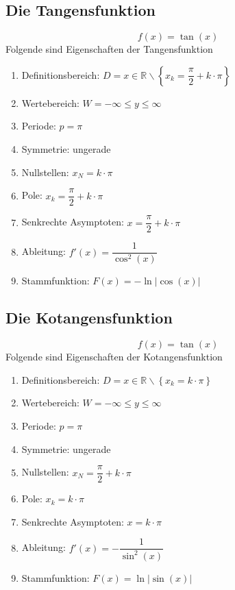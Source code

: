 \subsection{Die Tangensfunktion}
\begin{equation}
\boxed{f\left(x\right)=\tan\left(x\right)}
\end{equation}
Folgende sind Eigenschaften der Tangensfunktion
\begin{enumerate}[$(a)$]
\item Definitionsbereich: $D=x\in \mathbb{R}\backslash \left\{x_k=\dfrac{\pi}{2}+k\cdot \pi\right\}$
\item Wertebereich: $W=-\infty\leq y \leq \infty$
\item Periode: $p=\pi$
\item Symmetrie: ungerade
\item Nullstellen: $x_N=k\cdot \pi$
\item Pole: $x_k=\dfrac{\pi}{2}+k\cdot \pi$
\item Senkrechte Asymptoten: $x=\dfrac{\pi}{2}+k\cdot \pi$
\item Ableitung: $f'\left(x\right)=\dfrac{1}{\cos^2\left(x\right)}$
\item Stammfunktion: $F\left(x\right)=-\ln\Big\vert\cos\left(x\right)\Big\vert$
\end{enumerate}
\subsection{Die Kotangensfunktion}
\begin{equation}
\boxed{f\left(x\right)=\tan\left(x\right)}
\end{equation}
Folgende sind Eigenschaften der Kotangensfunktion
\begin{enumerate}[$(a)$]
\item Definitionsbereich: $D=x\in \mathbb{R}\backslash \left\{x_k=k\cdot \pi\right\}$
\item Wertebereich: $W=-\infty\leq y \leq \infty$
\item Periode: $p=\pi$
\item Symmetrie: ungerade
\item Nullstellen: $x_N=\dfrac{\pi}{2}+k\cdot \pi$
\item Pole: $x_k=k\cdot \pi$
\item Senkrechte Asymptoten: $x=k\cdot \pi$
\item Ableitung: $f'\left(x\right)=-\dfrac{1}{\sin^2\left(x\right)}$
\item Stammfunktion: $F\left(x\right)=\ln\Big\vert\sin\left(x\right)\Big\vert$
\end{enumerate}
